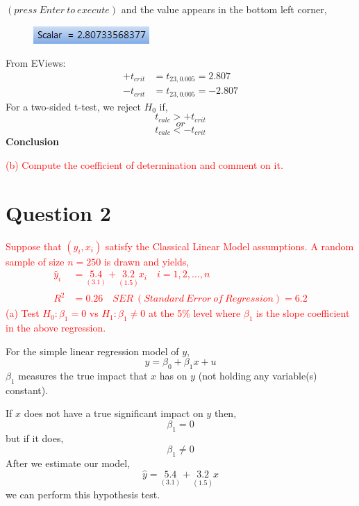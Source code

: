 \documentclass[12pt]{report}
\begin{document}
\vspace{-\baselineskip}\centering $(press\ Enter\ to\ execute)$
\justify and the value appears in the bottom left corner,
\begin{figure}[H]
	\centering
	\includegraphics{tute6_q1_3}
\end{figure}
\vspace{-\baselineskip}
\noindent From EViews: \begin{align*}
+t_{crit} &= t_{23,0.005} = 2.807 \\
-t_{crit} &= t_{23,0.005} = -2.807
\end{align*}
\noindent For a two-sided t-test, we reject $H_0$ if,
$$t_{calc} > +t_{crit}$$
$$or$$
$$t_{calc} < -t_{crit}$$
\noindent \textbf{Conclusion}
\vspace{20mm}

\noindent \textcolor{red}{(b) Compute the coefficient of determination and comment on it.}


\newpage
\section*{Question 2}
\noindent \textcolor{red}{Suppose that $(y_i,x_i)$ satisfy the Classical Linear Model assumptions. A random sample of size $n=250$ is drawn and yields,
\begin{align*}
	\hat{y}_i &= \underset{(3.1)}{5.4} + \underset{(1.5)}{3.2}x_i \quad i=1,2,\dots,n \\
	R^2 &= 0.26 \quad SER\ (Standard\ Error\ of\ Regression) = 6.2
\end{align*} (a) Test $H_0: \beta_1 = 0$ vs $H_1: \beta_1 \neq 0$ at the 5\% level where $\beta_1$ is the slope coefficient in the above regression.}

\noindent For the simple linear regression model of $y$, $$y = \beta_0 + \beta_1 x + u$$ $\beta_1$ measures the true impact that $x$ has on $y$ (not holding any variable(s) constant). 

\noindent If $x$ does not have a true significant impact on $y$ then, $$\beta_1 = 0$$ but if it does,  $$\beta_1 \neq 0$$ After we estimate our model, $$\hat{y} = \underset{(3.1)}{5.4} + \underset{(1.5)}{3.2}x$$ we can perform this hypothesis test.
\end{document}
